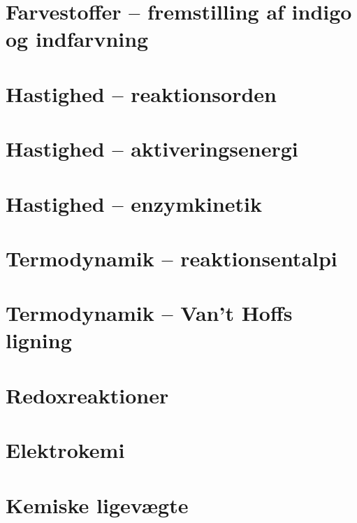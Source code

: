 \documentclass[10pt,a4paper]{article}
\theoremstyle{break}
\theoremstyle{nonumberplain}
\begin{document}
\pagebreak


\section{Farvestoffer – fremstilling af indigo og indfarvning}

\pagebreak


\section{Hastighed – reaktionsorden}

\pagebreak


\section{Hastighed – aktiveringsenergi}

\pagebreak


\section{Hastighed – enzymkinetik}

\pagebreak


\section{Termodynamik – reaktionsentalpi}

\pagebreak


\section{Termodynamik – Van’t Hoffs ligning}

\pagebreak

\section{Redoxreaktioner}

\pagebreak


\section{Elektrokemi}

\pagebreak


\section{Kemiske ligevægte}
\end{document}
